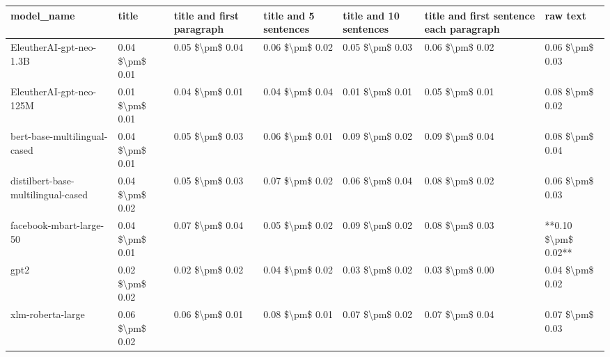 \begin{tabular}{lllllll}
\toprule
                        model\_name &           title & title and first paragraph & title and 5 sentences & title and 10 sentences & title and first sentence each paragraph &            raw text \\
\midrule
           EleutherAI-gpt-neo-1.3B & 0.04 \$\textbackslash pm\$ 0.01 &           0.05 \$\textbackslash pm\$ 0.04 &       0.06 \$\textbackslash pm\$ 0.02 &        0.05 \$\textbackslash pm\$ 0.03 &                         0.06 \$\textbackslash pm\$ 0.02 &     0.06 \$\textbackslash pm\$ 0.03 \\
           EleutherAI-gpt-neo-125M & 0.01 \$\textbackslash pm\$ 0.01 &           0.04 \$\textbackslash pm\$ 0.01 &       0.04 \$\textbackslash pm\$ 0.04 &        0.01 \$\textbackslash pm\$ 0.01 &                         0.05 \$\textbackslash pm\$ 0.01 &     0.08 \$\textbackslash pm\$ 0.02 \\
      bert-base-multilingual-cased & 0.04 \$\textbackslash pm\$ 0.01 &           0.05 \$\textbackslash pm\$ 0.03 &       0.06 \$\textbackslash pm\$ 0.01 &        0.09 \$\textbackslash pm\$ 0.02 &                         0.09 \$\textbackslash pm\$ 0.04 &     0.08 \$\textbackslash pm\$ 0.04 \\
distilbert-base-multilingual-cased & 0.04 \$\textbackslash pm\$ 0.02 &           0.05 \$\textbackslash pm\$ 0.03 &       0.07 \$\textbackslash pm\$ 0.02 &        0.06 \$\textbackslash pm\$ 0.04 &                         0.08 \$\textbackslash pm\$ 0.02 &     0.06 \$\textbackslash pm\$ 0.03 \\
           facebook-mbart-large-50 & 0.04 \$\textbackslash pm\$ 0.01 &           0.07 \$\textbackslash pm\$ 0.04 &       0.05 \$\textbackslash pm\$ 0.02 &        0.09 \$\textbackslash pm\$ 0.02 &                         0.08 \$\textbackslash pm\$ 0.03 & **0.10 \$\textbackslash pm\$ 0.02** \\
                              gpt2 & 0.02 \$\textbackslash pm\$ 0.02 &           0.02 \$\textbackslash pm\$ 0.02 &       0.04 \$\textbackslash pm\$ 0.02 &        0.03 \$\textbackslash pm\$ 0.02 &                         0.03 \$\textbackslash pm\$ 0.00 &     0.04 \$\textbackslash pm\$ 0.02 \\
                 xlm-roberta-large & 0.06 \$\textbackslash pm\$ 0.02 &           0.06 \$\textbackslash pm\$ 0.01 &       0.08 \$\textbackslash pm\$ 0.01 &        0.07 \$\textbackslash pm\$ 0.02 &                         0.07 \$\textbackslash pm\$ 0.04 &     0.07 \$\textbackslash pm\$ 0.03 \\
\bottomrule
\end{tabular}
